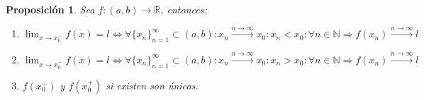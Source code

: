 \documentclass[10pt,a4paper,openright]{book}
\theoremstyle{break}
\newtheorem{prop}{Proposición}[chapter]
\begin{document}
\begin{prop}
Sea $f: (a,b)\longrightarrow \mathbb R$, entonces:
\begin{enumerate}
\item $\lim_{x\rightarrow x_0^-}f(x)=l\Leftrightarrow \forall \{x_n\}_{n=1}^\infty \subset (a,b): x_n\xrightarrow{n\rightarrow \infty} x_0: x_n<x_0: \forall n\in \mathbb N\Rightarrow f(x_n)\xrightarrow{n\rightarrow \infty}l$

\item $\lim_{x\rightarrow x_0^+}f(x)=l\Leftrightarrow \forall \{x_n\}_{n=1}^\infty \subset (a,b): x_n\xrightarrow{n\rightarrow \infty} x_0: x_n>x_0: \forall n\in \mathbb N\Rightarrow f(x_n)\xrightarrow{n\rightarrow \infty}l$

\item $f(x_0^-)$ y $f(x_0^+)$ si existen son únicos.
\end{enumerate}
\end{prop}
\end{document}
